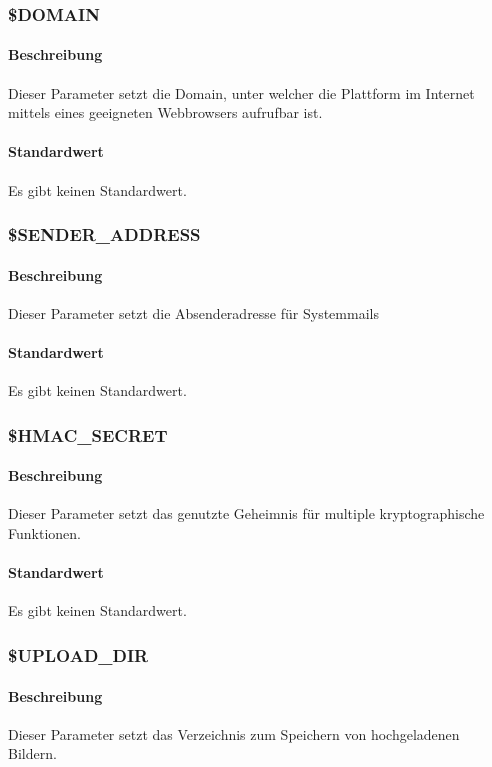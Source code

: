 \subsubsection{\$DOMAIN}
\paragraph{Beschreibung}Dieser Parameter setzt die Domain, unter welcher die Plattform im Internet mittels eines geeigneten Webbrowsers aufrufbar ist.
\paragraph{Standardwert}Es gibt keinen Standardwert.

\subsubsection{\$SENDER\_ADDRESS}
\paragraph{Beschreibung}Dieser Parameter setzt die Absenderadresse für Systemmails
\paragraph{Standardwert}Es gibt keinen Standardwert.

\subsubsection{\$HMAC\_SECRET} \label{config:hmac-secret}
\paragraph{Beschreibung}Dieser Parameter setzt das genutzte Geheimnis für multiple kryptographische Funktionen.
\paragraph{Standardwert}Es gibt keinen Standardwert.

\subsubsection{\$UPLOAD\_DIR}
\paragraph{Beschreibung}Dieser Parameter setzt das Verzeichnis zum Speichern von hochgeladenen Bildern.
